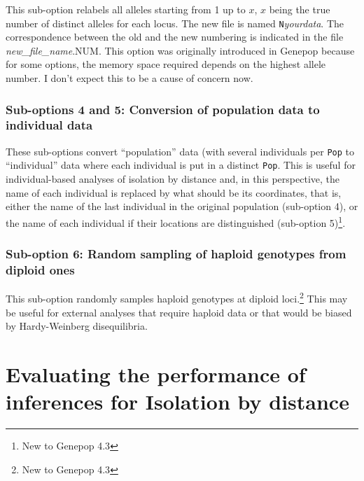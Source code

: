 \documentclass[
  12pt,
]{book}
\begin{document}
This sub-option relabels all alleles starting from 1 up to \(x\), \(x\) being the true number of distinct alleles for each locus. The new file is named \texttt{N}\emph{yourdata}. The correspondence between the old and the new numbering is indicated in the file \emph{new\_file\_name}.NUM. This option was originally introduced in Genepop because for some options, the memory space required depends on the highest allele number. I don't expect this to be a cause of concern now.

\hypertarget{sub-options-4-and-5-conversion-of-population-data-to-individual-data}{%
\subsection{Sub-options 4 and 5: Conversion of population data to individual data}\label{sub-options-4-and-5-conversion-of-population-data-to-individual-data}}

These sub-options convert ``population'' data (with several individuals per \texttt{Pop} to ``individual'' data where each individual is put in a distinct \texttt{Pop}. This is useful for individual-based analyses of isolation by distance and, in this perspective, the name of each individual is replaced by what should be its coordinates, that is, either the name of the last individual in the original population (sub-option 4), or the name of each individual if their locations are distinguished (sub-option 5)\footnote{New to Genepop 4.3}.

\hypertarget{sub-option-6-random-sampling-of-haploid-genotypes-from-diploid-ones}{%
\subsection{Sub-option 6: Random sampling of haploid genotypes from diploid ones}\label{sub-option-6-random-sampling-of-haploid-genotypes-from-diploid-ones}}

This sub-option randomly samples haploid genotypes at diploid loci.\footnote{New to Genepop 4.3} This may be useful for external analyses that require haploid data or that would be biased by Hardy-Weinberg disequilibria.

\hypertarget{evaluating-the-performance-of-inferences-for-isolation-by-distance}{%
\chapter{Evaluating the performance of inferences for Isolation by distance}\label{evaluating-the-performance-of-inferences-for-isolation-by-distance}}
\end{document}
